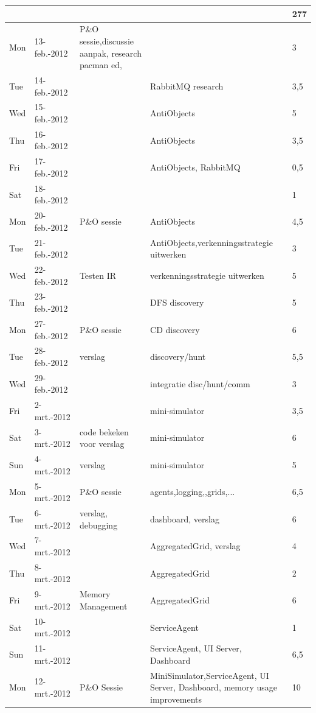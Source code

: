 \documentclass[12pt,a4paper]{report}
\begin{document}
\begin{landscape}
\begin{longtable}{llp{7cm}p{10cm}l}
\\[-1.8ex] \hline \hline
\endlastfoot
\hline
 &  &  &  & 277 \\ 
\hline
Mon & 13-feb.-2012 & P\&O sessie,discussie aanpak, research pacman ed,  &  & 3 \\ 
\hline
Tue & 14-feb.-2012 &  & RabbitMQ research & 3,5 \\ 
\hline
Wed & 15-feb.-2012 &  & AntiObjects & 5 \\ 
\hline
Thu & 16-feb.-2012 &  & AntiObjects & 3,5 \\ 
\hline
Fri & 17-feb.-2012 &  & AntiObjects, RabbitMQ & 0,5 \\ 
\hline
Sat & 18-feb.-2012 &  &  & 1 \\ 
\hline
Mon & 20-feb.-2012 & P\&O sessie & AntiObjects & 4,5 \\ 
\hline
Tue & 21-feb.-2012 &  & AntiObjects,verkenningsstrategie uitwerken & 3 \\ 
\hline
Wed & 22-feb.-2012 & Testen IR & verkenningsstrategie uitwerken & 5 \\ 
\hline
Thu & 23-feb.-2012 &  & DFS discovery & 5 \\ 
\hline
Mon & 27-feb.-2012 & P\&O sessie & CD discovery & 6 \\ 
\hline
Tue & 28-feb.-2012 & verslag & discovery/hunt & 5,5 \\ 
\hline
Wed & 29-feb.-2012 &  & integratie disc/hunt/comm & 3 \\ 
\hline
Fri & 2-mrt.-2012 &  & mini-simulator & 3,5 \\ 
\hline
Sat & 3-mrt.-2012 & code bekeken voor verslag & mini-simulator & 6 \\ 
\hline
Sun & 4-mrt.-2012 & verslag & mini-simulator & 5 \\ 
\hline
Mon & 5-mrt.-2012 & P\&O sessie & agents,logging,,grids,... & 6,5 \\ 
\hline
Tue & 6-mrt.-2012 & verslag, debugging & dashboard, verslag & 6 \\ 
\hline
Wed & 7-mrt.-2012 &  & AggregatedGrid, verslag & 4 \\ 
\hline
Thu & 8-mrt.-2012 &  & AggregatedGrid & 2 \\ 
\hline
Fri & 9-mrt.-2012 & Memory Management & AggregatedGrid & 6 \\ 
\hline
Sat & 10-mrt.-2012 &  & ServiceAgent & 1 \\ 
\hline
Sun & 11-mrt.-2012 &  & ServiceAgent, UI Server, Dashboard & 6,5 \\ 
\hline
Mon & 12-mrt.-2012 & P\&O Sessie & MiniSimulator,ServiceAgent, UI Server, Dashboard, memory usage improvements & 10 \\ 

\end{longtable}
\end{landscape}
\end{document}
